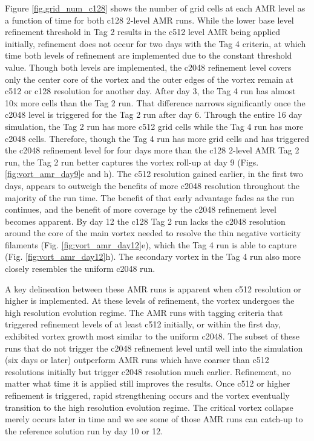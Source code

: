 Figure \ref{fig.grid_num_c128} shows the number of grid cells at each AMR 
level as a function of time for both c128 2-level AMR runs.  While the lower 
base level refinement threshold in Tag 2 results in the c512 level AMR being applied
initially, refinement does not occur for two days with the Tag 4 criteria, at which time
both levels of refinement are implemented due 
to the constant threshold value. Though both levels are implemented,
the c2048 refinement level 
covers only the center core of the vortex and 
the outer edges of the vortex remain at
c512 or c128 resolution for another day.
After day 3, the Tag 4 run has almost 10x more 
cells than the Tag 2 run. That difference narrows significantly once the c2048
level is triggered for the Tag 2 run after day 6. 
Through the entire 16 day simulation, the Tag 2 run has more c512 grid
cells while the Tag 4 run has more c2048 cells. Therefore, though the Tag 4 run
has more grid cells and has triggered the c2048 refinement level for four days more than the 
c128 2-level AMR Tag 2 run, the Tag 2 run better captures the vortex roll-up at day 9 
(Figs. \ref{fig:vort_amr_day9}e and h).
The c512 resolution gained earlier, in the first two days, appears to outweigh the benefits 
of more c2048 resolution throughout the majority of the run time. 
The benefit of that early advantage fades as the run continues, and the benefit of more coverage by
the c2048 refinement level becomes apparent. By day 12 
the c128 Tag 2 run lacks the c2048 resolution around the core of the main 
vortex needed to resolve the thin negative vorticity filaments (Fig. \ref{fig:vort_amr_day12}e), 
which the Tag 4 run is able to capture (Fig. \ref{fig:vort_amr_day12}h). 
The secondary vortex in the Tag 4 run also more closely resembles the uniform c2048 run.

A key delineation between these AMR runs is apparent 
when c512 resolution or higher is implemented. At these 
levels of refinement, the vortex undergoes the high resolution evolution regime.
The AMR runs with tagging criteria that triggered refinement levels 
of at least c512 initially, or within the first day, exhibited 
vortex growth most similar to the uniform c2048. 
The subset of these runs that do not trigger the c2048 
refinement level until well into the simulation (six days or later)  
outperform AMR runs which have coarser than c512 resolutions 
initially but trigger c2048 resolution much earlier. 
Refinement, no matter what time it is applied still improves the results. 
Once c512 or higher refinement is triggered, rapid strengthening occurs 
and the vortex eventually transition to the high resolution evolution 
regime. The critical vortex collapse merely occurs later in time and we
see some of those AMR runs can catch-up to the 
reference solution run by day 10 or 12.

